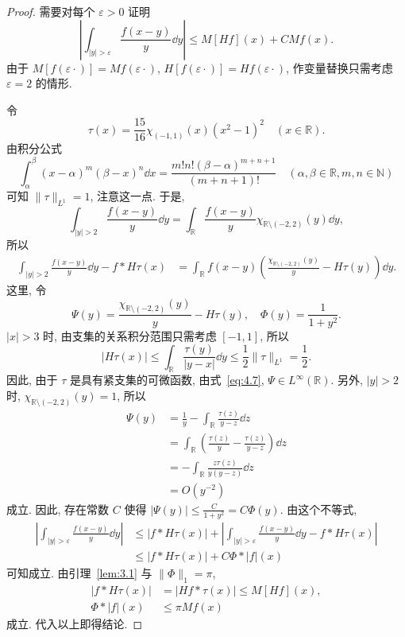 \begin{proof}
需要对每个 $\varepsilon > 0$ 证明
\[
\left|\int_{|y| > \varepsilon}\frac{f(x-y)}{y}\dd y\right| \leq M[Hf](x) + CMf(x).
\]
由于 $M[f(\varepsilon\cdot)] = Mf(\varepsilon\cdot)$, $H[f(\varepsilon\cdot)] = Hf(\varepsilon\cdot)$, 作变量替换只需考虑 $\varepsilon = 2$ 的情形.

令
\[
\tau(x) = \frac{15}{16}\chi_{(-1,1)}(x)(x^{2}-1)^{2} \quad (x \in \mathbb{R}).
\]
由积分公式
\[
\int_{\alpha}^{\beta}(x-\alpha)^{m}(\beta-x)^{n}\dd x = \frac{m!n!(\beta-\alpha)^{m+n+1}}{(m+n+1)!} \quad (\alpha, \beta \in \mathbb{R}, m, n \in \mathbb{N})
\]
可知 $\|\tau\|_{L^{1}} = 1$, 注意这一点. 于是,
\[
\int_{|y| > 2}\frac{f(x-y)}{y}\dd y = \int_{\mathbb{R}}\frac{f(x-y)}{y}\chi_{\mathbb{R}\setminus(-2,2)}(y)\dd y,
\]
所以
\begin{align*}
\int_{|y| > 2}\frac{f(x-y)}{y}\dd y - f * H\tau(x) &= \int_{\mathbb{R}}f(x-y)\left(\frac{\chi_{\mathbb{R}\setminus(-2,2)}(y)}{y} - H\tau(y)\right)\dd y.
\end{align*}
这里, 令
\[
\Psi(y) = \frac{\chi_{\mathbb{R}\setminus(-2,2)}(y)}{y} - H\tau(y), \quad \Phi(y) = \frac{1}{1+y^{2}}.
\]
$|x| > 3$ 时, 由支集的关系积分范围只需考虑 $[-1, 1]$, 所以
\[
|H\tau(x)| \leq \int_{\mathbb{R}}\frac{\tau(y)}{|y-x|}\dd y \leq \frac{1}{2}\|\tau\|_{L^{1}} = \frac{1}{2}.
\]
因此, 由于 $\tau$ 是具有紧支集的可微函数, 由式~\eqref{eq:4.7}, $\Psi \in L^{\infty}(\mathbb{R})$. 另外, $|y| > 2$ 时, $\chi_{\mathbb{R}\setminus(-2,2)}(y) = 1$, 所以
\begin{align*}
\Psi(y) &= \frac{1}{y} - \int_{\mathbb{R}}\frac{\tau(z)}{y-z}\dd z \\
&= \int_{\mathbb{R}}\left(\frac{\tau(z)}{y} - \frac{\tau(z)}{y-z}\right)\dd z \\
&= -\int_{\mathbb{R}}\frac{z\tau(z)}{y(y-z)}\dd z \\
&= O(y^{-2})
\end{align*}
成立. 因此, 存在常数 $C$ 使得 $|\Psi(y)| \leq \frac{C}{1+y^{2}} = C\Phi(y)$. 由这个不等式,
\begin{align*}
\left|\int_{|y| > \varepsilon}\frac{f(x-y)}{y}\dd y\right| &\leq |f * H\tau(x)| + \left|\int_{|y| > \varepsilon}\frac{f(x-y)}{y}\dd y - f * H\tau(x)\right| \\
&\leq |f * H\tau(x)| + C\Phi * |f|(x)
\end{align*}
可知成立. 由引理~\ref{lem:3.1} 与 $\|\Phi\|_{1} = \pi$,
\begin{align*}
|f * H\tau(x)| &= |Hf * \tau(x)| \leq M[Hf](x), \\
\Phi * |f|(x) &\leq \pi Mf(x)
\end{align*}
成立. 代入以上即得结论.
\end{proof}


